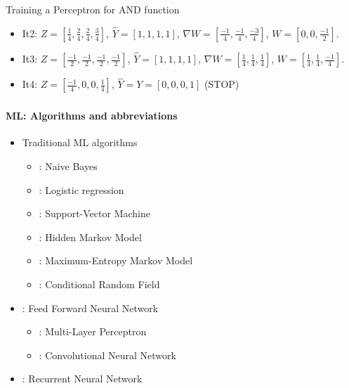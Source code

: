 \documentclass[xcolor=table]{beamer}
\begin{document}
\begin{frame}
\begin{exampleblock}{Training a Perceptron for AND function}
\begin{minipage}{0.79\textwidth}
\begin{itemize}
				\item It2: $ Z = [\frac{1}{4}, \frac{2}{4}, \frac{2}{4}, \frac{3}{4}] $, 
				$ \hat{Y} = [1, 1, 1, 1] $, 
				$ \nabla W = [\frac{-1}{4}, \frac{-1}{4}, \frac{-3}{4}] $,
				$ W = [0, 0, \frac{-1}{2}] $.
				
				\item It3: $ Z = [\frac{-1}{2}, \frac{-1}{2}, \frac{-1}{2}, \frac{-1}{2}] $, 
				$ \hat{Y} = [1, 1, 1, 1] $, 
				$ \nabla W = [\frac{1}{4}, \frac{1}{4}, \frac{1}{4}] $,
				$ W = [\frac{1}{4}, \frac{1}{4}, \frac{-1}{4}] $.
				
				\item It4: $ Z = [\frac{-1}{4}, 0, 0, \frac{1}{4}] $, 
				$ \hat{Y} = Y = [0, 0, 0, 1] $ (STOP)
			\end{itemize}
		\end{minipage}
	\end{exampleblock}
	
\end{frame}
	
\begin{frame}
	\frametitle{\inserttitle}
	\framesubtitle{ML: Algorithms and abbreviations}
	
	\begin{itemize}
		\item Traditional ML algorithms
		\begin{itemize}
			\item {}: Naive Bayes
			\item {}: Logistic regression
			\item {}: Support-Vector Machine
			\item {}: Hidden Markov Model
			\item {}: Maximum-Entropy Markov Model
			\item {}: Conditional Random Field
		\end{itemize}
		\item {}: Feed Forward Neural Network
		\begin{itemize}
			\item {}: Multi-Layer Perceptron
			\item {}: Convolutional Neural Network
		\end{itemize} 
		\item {}: Recurrent Neural Network
	\end{itemize}
	
\end{frame}
\end{document}
